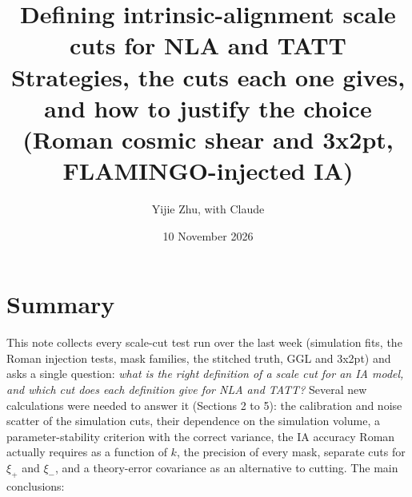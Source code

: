 \documentclass[11pt]{article}
\title{Defining intrinsic-alignment scale cuts for NLA and TATT\\[3pt]
\large Strategies, the cuts each one gives, and how to justify the choice\\
(Roman cosmic shear and 3x2pt, FLAMINGO-injected IA)}
\author{Yijie Zhu, with Claude}
\date{10 November 2026}
\begin{document}
\maketitle

\section*{Summary}

This note collects every scale-cut test run over the last week (simulation
fits, the Roman injection tests, mask families, the stitched truth, GGL and
3x2pt) and asks a single question: \emph{what is the right definition of a
scale cut for an IA model, and which cut does each definition give for NLA
and TATT?} Several new calculations were needed to answer it (Sections 2 to 5):
the calibration and noise scatter of the simulation cuts, their dependence on
the simulation volume, a parameter-stability criterion with the correct
variance, the IA accuracy Roman actually requires as a function of $k$, the
precision of every mask, separate cuts for $\xi_+$ and $\xi_-$, and a
theory-error covariance as an alternative to cutting. The main conclusions:
\end{document}
